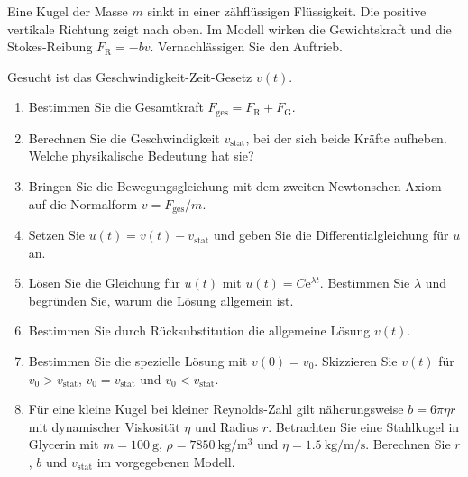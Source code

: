\begin{ExerciseBlock}
Eine Kugel der Masse $m$ sinkt in einer zähflüssigen Flüssigkeit. Die positive vertikale Richtung zeigt nach oben. Im Modell wirken die Gewichtskraft und die Stokes-Reibung $F_\mathrm R=-bv$. Vernachlässigen Sie den Auftrieb.
\begin{center}
\end{center}
Gesucht ist das Geschwindigkeit-Zeit-Gesetz $v(t)$.
\begin{enumerate}
\item Bestimmen Sie die Gesamtkraft $F_\mathrm{ges}=F_\mathrm R+F_\mathrm G$.
\item Berechnen Sie die Geschwindigkeit $v_\mathrm{stat}$, bei der sich beide Kräfte aufheben. Welche physikalische Bedeutung hat sie?
\item Bringen Sie die Bewegungsgleichung mit dem zweiten Newtonschen Axiom auf die Normalform $\dot v=F_\mathrm{ges}/m$.
\item Setzen Sie $u(t)=v(t)-v_\mathrm{stat}$ und geben Sie die Differentialgleichung für $u$ an.
\item Lösen Sie die Gleichung für $u(t)$ mit $u(t)=C\mathrm e^{\lambda t}$. Bestimmen Sie $\lambda$ und begründen Sie, warum die Lösung allgemein ist.
\item Bestimmen Sie durch Rücksubstitution die allgemeine Lösung $v(t)$.
\item Bestimmen Sie die spezielle Lösung mit $v(0)=v_0$. Skizzieren Sie $v(t)$ für $v_0>v_\mathrm{stat}$, $v_0=v_\mathrm{stat}$ und $v_0<v_\mathrm{stat}$.
\item Für eine kleine Kugel bei kleiner Reynolds-Zahl gilt näherungsweise $b=6\pi\eta r$ mit dynamischer Viskosität $\eta$ und Radius $r$. Betrachten Sie eine Stahlkugel in Glycerin mit $m=\qty{100}{\gram}$, $\rho=\qty{7850}{\kilogram\per\metre\cubed}$ und $\eta=\qty{1.5}{\kilogram\per\metre\per\second}$. Berechnen Sie $r$, $b$ und $v_\mathrm{stat}$ im vorgegebenen Modell.
\end{enumerate}
\end{ExerciseBlock}
